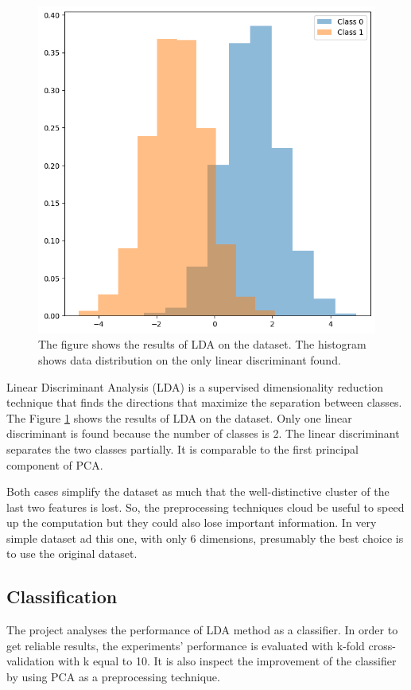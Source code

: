 \documentclass{article}
\begin{document}
\begin{figure}[ht]
    \centering
    \includegraphics[width=\textwidth]{images/dataset_lda.png}
    \caption{The figure shows the results of LDA on the dataset. The histogram shows data distribution on the only linear discriminant found.}
    \label{fig:dataset_lda}
\end{figure}

Linear Discriminant Analysis (LDA) is a supervised dimensionality reduction technique that finds the directions that maximize the separation between classes. 
The Figure \ref{fig:dataset_lda} shows the results of LDA on the dataset. Only one linear discriminant is found because the number of classes is 2. The linear discriminant separates the two classes partially. It is comparable to the first principal component of PCA.

Both cases simplify the dataset as much that the well-distinctive cluster of the last two features is lost. So, the preprocessing techniques cloud be useful to speed up the computation but they could also lose important information. In very simple dataset ad this one, with only 6 dimensions, presumably the best choice is to use the original dataset.

\subsection{Classification}
The project analyses the performance of LDA method as a classifier. In order to get reliable results, the experiments' performance is evaluated with k-fold cross-validation with k equal to 10. It is also inspect the improvement of the classifier by using PCA as a preprocessing technique.
\end{document}
